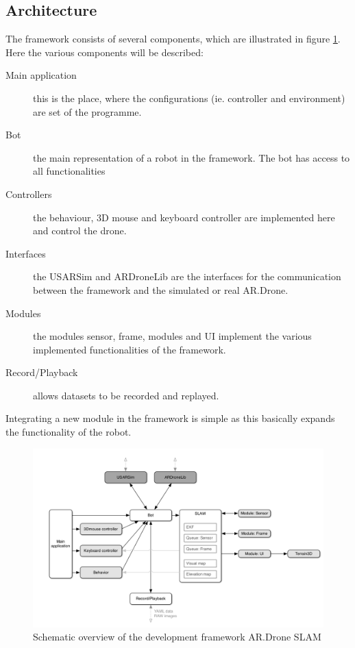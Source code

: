 \documentclass[a4paper]{article}
\begin{document}
\subsection{Architecture}
The framework consists of several components, which are illustrated in figure \ref{frameworknick}. Here the various components will be described:
\begin{description}
\item[Main application] this is the place, where the configurations (ie. controller and environment) are set of the programme.
\item[Bot] the main representation of a robot in the framework. The bot has access to all functionalities
\item[Controllers] the behaviour, 3D mouse and keyboard controller are implemented here and control the drone.
\item[Interfaces] the USARSim and ARDroneLib are the interfaces for the communication between the framework and the simulated or real AR.Drone.
\item[Modules] the modules sensor, frame, modules and UI implement the various implemented functionalities of the framework.
\item[Record/Playback] allows datasets to be recorded and replayed.
\end{description}
Integrating a new module in the framework is simple as this basically expands the functionality of the robot.
\begin{figure}[!ht]
\centering
\includegraphics[width=\textwidth]{images/framework.png}
\caption{Schematic overview \cite{Dijkshoorn2012} of the development framework AR.Drone SLAM}
\label{frameworknick}
\end{figure}

\newpage
\end{document}
